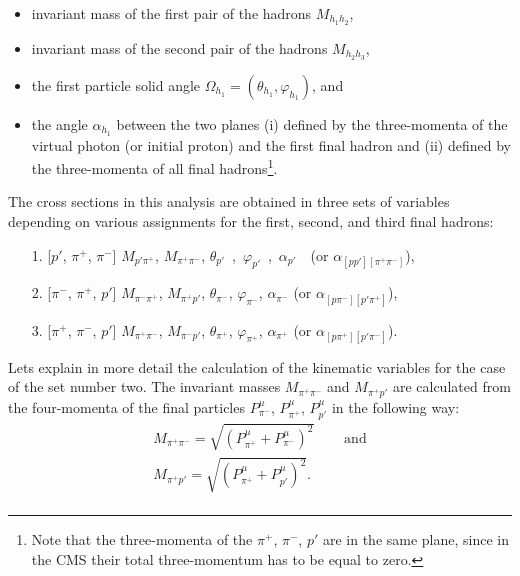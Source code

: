 \begin{itemize}
\item invariant mass of the first pair of the hadrons $M_{h_{1}h_{2}}$,\vspace{-0.4em}
\item invariant mass of the second pair of the hadrons $M_{h_{2}h_{3}}$,\vspace{-0.4em}
\item the first particle solid angle $\Omega_{h_{1}} = (\theta_{h_{1}}, \varphi_{h_{1}})$, and\vspace{-0.4em}
\item the angle $\alpha_{h_{1}}$ between the two planes (i) defined by the three-momenta of the virtual photon (or initial proton) and the first final hadron and (ii) defined by the three-momenta of all final hadrons\footnote[6]{Note that the three-momenta of the $\pi^{+}$, $\pi^{-}$, $p'$ are in the same plane, since in the CMS their total three-momentum has to be equal to zero.}.\vspace{-0.5em}
\end{itemize}

The cross sections in this analysis are obtained in three sets of variables depending on various assignments for the first, second, and third final hadrons:\vspace{-0.5em}
\begin{itemize}
\item[1.] [$p'$, $\pi^{+}$, $\pi^{-}$]
$M_{p'\pi^{+}}$, $M_{\pi^{+}\pi^{-}}$, $\theta_{p'}$~,~$\varphi_{p'}$~,~$\alpha_{p'}$~~(or $\alpha_{[pp'][\pi^{+}\pi^{-}]}$),\vspace{-0.25em}

\item[2.] [$\pi^{-}$, $\pi^{+}$, $p'$]
$M_{\pi^{-}\pi^{+}}$, $M_{\pi^{+}p'}$, $\theta_{\pi^{-}}$, $\varphi_{\pi^{-}}$, $\alpha_{\pi^{-}}$ (or $\alpha_{[p\pi^{-}][p'\pi^{+}]}$),\vspace{-0.25em}


\item[3.]  [$\pi^{+}$, $\pi^{-}$, $p'$]
$M_{\pi^{+}\pi^{-}}$, $M_{\pi^{-}p'}$, $\theta_{\pi^{+}}$, $\varphi_{\pi^{+}}$, $\alpha_{\pi^{+}}$ (or $\alpha_{[p\pi^{+}][p'\pi^{-}]}$).\vspace{-0.5em}
\end{itemize}


Lets explain in more detail the calculation of the kinematic variables for the case of the set number two. The invariant masses $M_{\pi^{+}\pi^{-}}$ and $M_{\pi^{+}p'}$ are calculated from the four-momenta of the final particles $P_{\pi^{-}}^{\mu}$, $P_{\pi^{+}}^{\mu}$, $P_{p'}^{\mu}$ in the following way:
\begin{equation}
\begin{aligned}
M_{\pi^{+}\pi^{-}} = \sqrt{(P_{\pi^{+}}^{\mu} + P_{\pi^{-}}^{\mu})^{2}} & \text{~~~~and}\\ \label{invmasses}
M_{\pi^{+}p'} = \sqrt{(P_{\pi^{+}}^{\mu} + P_{p'}^{\mu})^{2}}. & \\ 
\end{aligned}  
\end{equation}  


